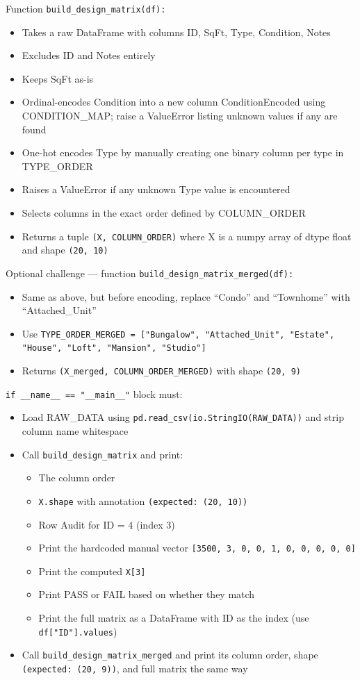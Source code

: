 \documentclass[11pt]{article}
\begin{document}
Function \texttt{build\_design\_matrix(df):}
\begin{itemize}
    \item Takes a raw DataFrame with columns ID, SqFt, Type, Condition, Notes
    \item Excludes ID and Notes entirely
    \item Keeps SqFt as-is
    \item Ordinal-encodes Condition into a new column ConditionEncoded using CONDITION\_MAP; raise a ValueError listing unknown values if any are found
    \item One-hot encodes Type by manually creating one binary column per type in TYPE\_ORDER
    \item Raises a ValueError if any unknown Type value is encountered
    \item Selects columns in the exact order defined by COLUMN\_ORDER
    \item Returns a tuple \texttt{(X, COLUMN\_ORDER)} where X is a numpy array of dtype float and shape \texttt{(20, 10)}
\end{itemize}

Optional challenge --- function \texttt{build\_design\_matrix\_merged(df):}
\begin{itemize}
    \item Same as above, but before encoding, replace ``Condo'' and ``Townhome'' with ``Attached\_Unit''
    \item Use \texttt{TYPE\_ORDER\_MERGED = ["Bungalow", "Attached\_Unit", "Estate", "House", "Loft", "Mansion", "Studio"]}
    \item Returns \texttt{(X\_merged, COLUMN\_ORDER\_MERGED)} with shape \texttt{(20, 9)}
\end{itemize}

\texttt{if \_\_name\_\_ == "\_\_main\_\_"} block must:
\begin{itemize}
    \item Load RAW\_DATA using \texttt{pd.read\_csv(io.StringIO(RAW\_DATA))} and strip column name whitespace
    \item Call \texttt{build\_design\_matrix} and print:
    \begin{itemize}
        \item The column order
        \item \texttt{X.shape} with annotation \texttt{(expected: (20, 10))}
        \item Row Audit for ID = 4 (index 3)
        \item Print the hardcoded manual vector \texttt{[3500, 3, 0, 0, 1, 0, 0, 0, 0, 0]}
        \item Print the computed \texttt{X[3]}
        \item Print PASS or FAIL based on whether they match
        \item Print the full matrix as a DataFrame with ID as the index (use \texttt{df["ID"].values})
    \end{itemize}
    \item Call \texttt{build\_design\_matrix\_merged} and print its column order, shape \texttt{(expected: (20, 9))}, and full matrix the same way
\end{itemize}
\end{document}
